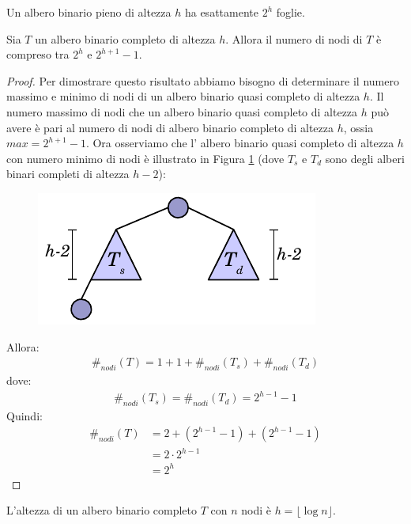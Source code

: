 \begin{corolbox}
Un albero binario pieno di altezza $h$ ha esattamente $2^{h}$ foglie.
\end{corolbox}


\begin{propbox}
Sia $T$ un albero binario completo di altezza $h$. Allora il numero di nodi di $T$ è compreso tra $2^{h}$ e $2^{h+1}-1$.
\end{propbox}

\begin{proof}
Per dimostrare questo risultato abbiamo bisogno di determinare il numero massimo e minimo di nodi di un albero binario quasi completo di altezza $h$. Il numero massimo di nodi che un albero binario quasi completo di altezza $h$ può avere è pari al numero di nodi di albero binario completo di altezza $h$, ossia $max = 2^{h+1}-1$. Ora osserviamo che l’ albero binario quasi completo di altezza $h$ con numero minimo di nodi è illustrato in Figura \ref{fig:alberoquasicompleto} (dove $T_{s}$ e $T_{d}$ sono degli alberi binari completi di altezza $h-2$):
\begin{figure}[ht!]
\centering
\includegraphics[scale=0.8]{res/Alberobinarioquasicompleto}
\caption{}\label{fig:alberoquasicompleto}
\end{figure}

Allora:
\begin{align*}
	\#_{nodi}(T) = 1+1+\#_{nodi}(T_{s})+\#_{nodi}(T_{d})
\end{align*}
dove:
\begin{align*}
\#_{nodi}(T_{s}) = \#_{nodi}(T_{d})=2^{h-1}-1
\end{align*}
Quindi:
\begin{align*}
\#_{nodi}(T) &= 2+(2^{h-1}-1)+(2^{h-1}-1)\\
&=2 \cdot 2^{h-1} \\
&= 2^{h}
\end{align*}

\end{proof}

\begin{propbox}
L'altezza di un albero binario completo $T$ con $n$ nodi è $h = \lfloor \log n \rfloor$.
\end{propbox}


